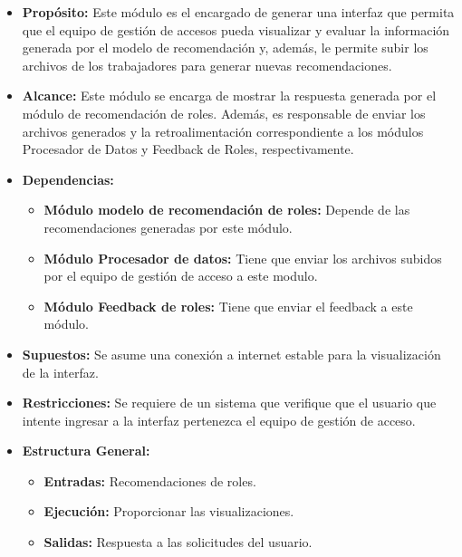 \documentclass[11pt,letterpaper]{article}
\begin{document}
\begin{itemize}

\item \textbf{Propósito:} Este módulo es el encargado de generar una interfaz que permita que el equipo de gestión de accesos pueda visualizar y evaluar la información generada por el modelo de recomendación y, además, le permite subir los archivos de los trabajadores para generar nuevas recomendaciones.

\item \textbf{Alcance:} Este módulo se encarga de mostrar la respuesta generada por el módulo de recomendación de roles. Además, es responsable de enviar los archivos generados y la retroalimentación correspondiente a los módulos Procesador de Datos y Feedback de Roles, respectivamente.

\item \textbf{Dependencias:}
\begin{itemize}
    \item \textbf{Módulo modelo de recomendación de roles: } Depende de las recomendaciones generadas por este módulo.
    \item \textbf{Módulo Procesador de datos:} Tiene que enviar los archivos subidos por el equipo de gestión de acceso a este modulo.
    \item \textbf{Módulo Feedback de roles: } Tiene que enviar el feedback a este módulo. 
\end{itemize}

\item \textbf{Supuestos:} Se asume una conexión a internet estable para la visualización de la interfaz.
    


\item \textbf{Restricciones:} Se requiere de un sistema que verifique que el usuario que intente ingresar a la interfaz pertenezca el equipo de gestión de acceso.
    

\item \textbf{Estructura General:}
\begin{itemize}
    \item \textbf{Entradas:} Recomendaciones de roles.
    \item \textbf{Ejecución:} Proporcionar las visualizaciones.
        
    \item \textbf{Salidas: } Respuesta a las solicitudes del usuario.
\end{itemize}
\end{itemize}
\end{document}
